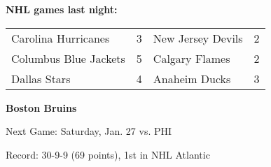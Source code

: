 \textbf{NHL games last night:
}\begin{tabular}{llll}
\toprule
  Carolina Hurricanes & 3 & New Jersey Devils & 2 \\
Columbus Blue Jackets & 5 &    Calgary Flames & 2 \\
         Dallas Stars & 4 &     Anaheim Ducks & 3 \\
\bottomrule
\end{tabular}

\textbf{Boston Bruins}

Next Game: Saturday, Jan. 27 vs. PHI

Record: 30-9-9 (69 points), 1st in NHL Atlantic 
